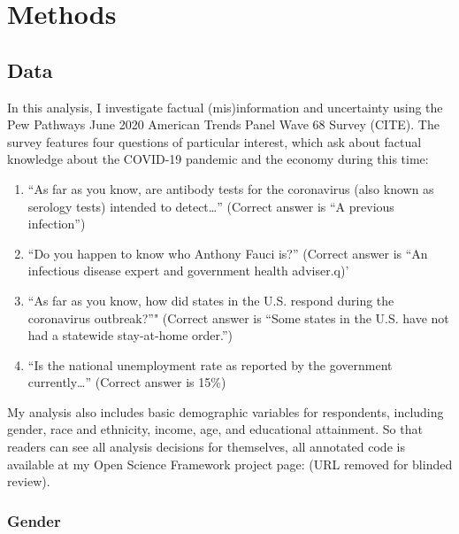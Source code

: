 \documentclass[11pt]{article}
\begin{document}
\section{Methods}\label{sec:methods}

\subsection{Data}\label{sec:data}

In this analysis, I investigate factual (mis)information and uncertainty using
the Pew Pathways June 2020 American Trends Panel Wave 68 Survey (CITE). The
survey features four questions of particular interest, which ask about factual
knowledge about the COVID-19 pandemic and the economy during this time:

\begin{enumerate}
\def\labelenumi{(\arabic{enumi})}
  \item ``As far as you know, are antibody tests for the coronavirus (also known as serology tests) intended to detect…'' (Correct answer is ``A previous infection'')
  \item ``Do you happen to know who Anthony Fauci is?'' (Correct answer is ``An infectious disease expert and government health adviser.q)'
  \item ``As far as you know, how did states in the U.S. respond during the coronavirus outbreak?''" (Correct answer is ``Some states in the U.S. have not had a statewide stay-at-home order.'')
  \item ``Is the national unemployment rate as reported by the government currently…'' (Correct answer is 15\%)
\end{enumerate}

My analysis also includes basic demographic variables for respondents, including
gender, race and ethnicity, income, age, and educational attainment. So that
readers can see all analysis decisions for themselves, all annotated code is
available at my Open Science Framework project page:
(URL removed for blinded review).


\subsubsection{Gender}\label{sec:gender}
\end{document}
